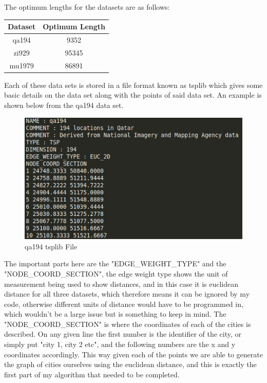 \documentclass[11pt,a4paper,titlepage]{article}
\begin{document}
The optimum lengths for the datasets are as follows:

\begin{center}
\begin{tabular}{c | c}
Dataset & Optimum Length \\ [0.5ex]
\hline
	qa194 & 9352 \\
	zi929 & 95345 \\
	mu1979 & 86891
\end{tabular}
\end{center}

Each of these data sets is stored in a file format known as tsplib which gives some basic details on the data set along with the points of said data set. An example is shown below from the qa194 data set.

\begin{figure}[ht]
	\includegraphics[scale=0.6]{tsplib_Example}
	\centering
	\caption{qa194 tsplib File}
\end{figure}

The important parts here are the "EDGE\_WEIGHT\_TYPE" and the "NODE\_COORD\_SECTION", the edge weight type shows the unit of measurement being used to show distances, and in this case it is euclidean distance for all three datasets, which therefore means it can be ignored by my code, otherwise different units of distance would have to be programmed in, which wouldn't be a large issue but is something to keep in mind. The "NODE\_COORD\_SECTION" is where the coordinates of each of the cities is described. On any given line the first number is the identifier of the city, or simply put "city 1, city 2 etc", and the following numbers are the x and y coordinates accordingly. This way given each of the points we are able to generate the graph of cities ourselves using the euclidean distance, and this is exactly the first part of my algorithm that needed to be completed.
\end{document}
